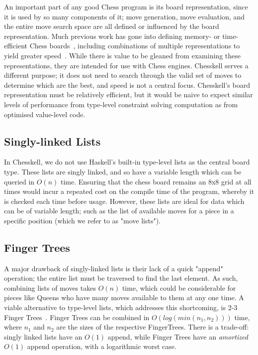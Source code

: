 An important part of any good Chess program is its board representation, since it is used by so many components of it; move generation, move evaluation, and the entire move search space are all defined or influenced by the board representation. Much previous work has gone into defining memory- or time-efficient Chess boards~\cite{bitboard,searchtables}, including combinations of multiple representations to yield greater speed~\cite{bitandccr}. While there is value to be gleaned from examining these representations, they are intended for use with Chess engines. Chesskell serves a different purpose; it does not need to search through the valid set of moves to determine which are the best, and speed is not a central focus. Chesskell's board representation must be relatively efficient, but it would be naive to expect similar levels of performance from type-level constraint solving computation as from optimised value-level code.

\subsection{Singly-linked Lists}

In Chesskell, we do not use Haskell's built-in type-level lists as the central board type. These lists are singly linked, and so have a variable length which can be queried in $O(n)$ time. Ensuring that the chess board remains an 8x8 grid at all times would incur a repeated cost on the compile time of the program, whereby it is checked each time before usage. However, these lists are ideal for data which can be of variable length; such as the list of available moves for a piece in a specific position (which we refer to as "move lists").

\subsection{Finger Trees}

A major drawback of singly-linked lists is their lack of a quick "append" operation; the entire list must be traversed to find the last element. As such, combining lists of moves takes $O(n)$ time, which could be considerable for pieces like Queens who have many moves available to them at any one time. A viable alternative to type-level lists, which addresses this shortcoming, is 2-3 Finger Trees~\cite{fingertrees}. Finger Trees can be combined in $O(log(min(n_{1}, n_{2})))$ time, where $n_{1}$ and $n_{2}$ are the sizes of the respective FingerTrees. There is a trade-off: singly linked lists have an $O(1)$ append, while Finger Trees have an \emph{amortized} $O(1)$ append operation, with a logarithmic worst case.

